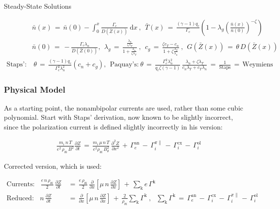 \documentclass[a4paper,8pt]{article}
\begin{document}
\normalsize

Steady-State Solutions \small

\begin{align}
    &\bar{n}(x) \,=\, \bar{n}(0) - \int_0^x \frac{\Gamma_c}{D(\bar{Z}(x))}~\text{d}x~,
        ~~ \bar{T}(x) \,=\, \frac{(\gamma - 1) q_c}{\Gamma_c} \left(1 - \lambda_g\left(\frac{\bar{n}(x)}{\bar{n}(0)}\right)^{-\zeta}\right) \\
    &\bar{n}(0) \,=\, -\frac{\Gamma_c \lambda_n}{D(\bar{Z}(0))},
        ~~ \lambda_g \,=\, \frac{\frac{\lambda_n}{\zeta \lambda_T}}{1 + \frac{\lambda_n}{\zeta \lambda_T}}~,
        ~~ c_g \,=\, \frac{\zeta c_T - c_n}{1 + \zeta \frac{\lambda_T}{\lambda_n}}~, ~~ G(\bar{Z}(x)) \,=\, \theta\,D(\bar{Z}(x)) \\
    \text{Staps':}& ~ \theta \,=\, \frac{(\gamma - 1) q_c}{\Gamma_c^2 \lambda_n^2} (c_n + c_g), ~~ \text{Paquay's:} ~ \theta \,=\, \frac{\Gamma_c^2 \lambda_n^2}{q_c \zeta (\gamma - 1)} \, \frac{\lambda_n + \zeta\lambda_T}{c_n\lambda_T + c_T\lambda_n} \,=\, \frac{1}{\text{Staps}} \,=\, \text{Weymiens}
\end{align}

\normalsize

\subsubsection{Physical Model}\label{physical-model}

As a starting point, the nonambipolar currents are used, rather than
some cubic polynomial. Start with Staps' derivation, now known to be
slightly incorrect, since the polarization current is defined slightly
incorrectly in his version: \small

\begin{align}
    &\frac{m_i \, n \, T}{e^2 \, \rho_{\theta i} \, B^2}
        \frac{\partial Z}{\partial t} \,=\,
        \frac{m_i \, \mu \, n \, T}{e^2 \rho_{\theta i} \, B_\theta^2} \,
        \frac{\partial^2 Z}{\partial x^2} \,+\, \Gamma_e^\text{an} \,-\,
        \Gamma_i^{\pi\parallel} \,-\, \Gamma_i^\text{cx} \,-\,
        \Gamma_i^\text{ol}
\end{align}

\normalsize

Corrected version, which is used: \small

\begin{align}
    \text{Currents:} ~~~~ \frac{e \, n \, \rho_{\theta i}}{2} \,
        \frac{\partial Z}{\partial t} \,&=\, \frac{e \, \rho_{\theta i}}
        {2} \, \frac{\partial}{\partial x} \left[\mu \, n \, \frac{\partial Z}
        {\partial x}\right] \,+\, \sum_\text{k} e \, \Gamma^\text{k} \\
    \text{Reduced:} ~~~~ n \, \frac{\partial Z}{\partial t} \,&=\, 
        \frac{\partial}{\partial x} \left[\mu \, n \,
        \frac{\partial Z}{\partial x} \right] \,+\, \frac{2}{\rho_{\theta i}}
        \sum_\text{k} \Gamma^\text{k}~, ~~~ \sum_\text{k} \Gamma^\text{k}
        \,=\, \Gamma_e^\text{an} \,-\, \Gamma_i^\text{cx}
        \,-\, \Gamma_i^{\pi\parallel} \,-\, \Gamma_i^\text{ol}
\end{align}
\end{document}
